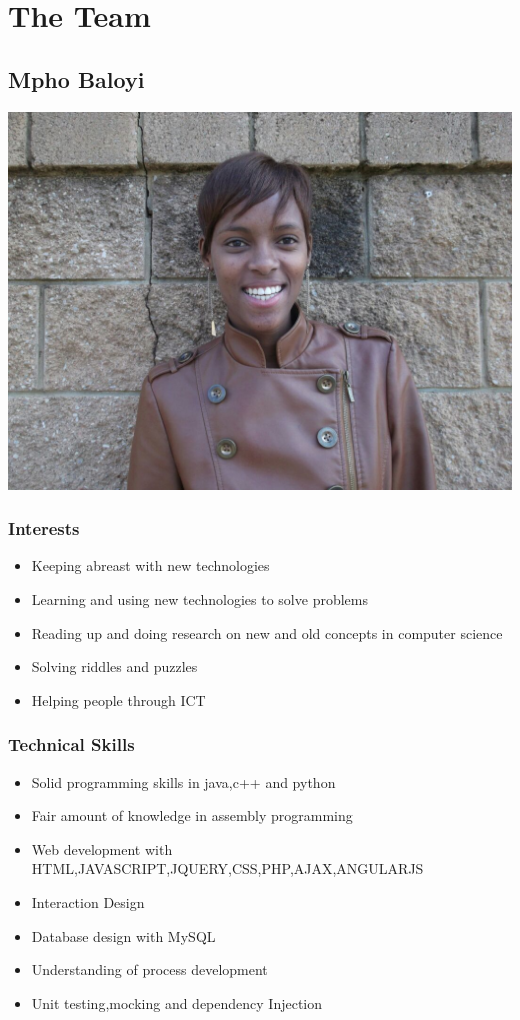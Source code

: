 \documentclass[a4paper,12pt]{article}
\begin{document}
\section{The Team}
\subsection{Mpho Baloyi}
\includegraphics[width=\textwidth]{images/Mpho}
\subsubsection{Interests}
\begin{itemize}
\item Keeping abreast with new technologies
\item Learning and using new technologies to solve problems
\item Reading up and doing research on new and old concepts in computer science
\item Solving riddles and puzzles
\item Helping people through ICT
\end{itemize}
\subsubsection{Technical Skills}
\begin{itemize}
\item Solid programming skills in java,c++ and python
\item Fair amount of knowledge in assembly programming
\item Web development with HTML,JAVASCRIPT,JQUERY,CSS,PHP,AJAX,ANGULARJS
\item Interaction Design
\item Database design with MySQL
\item Understanding of process development
\item Unit testing,mocking and dependency Injection
\end{itemize}
\end{document}
